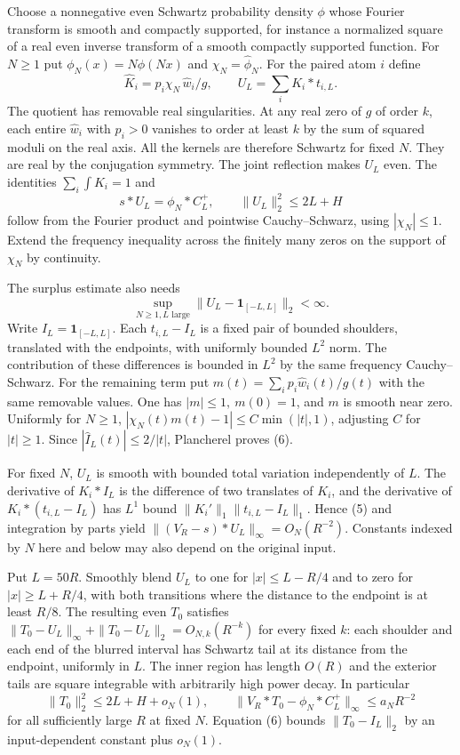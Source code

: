 \documentclass[11pt]{article}
\begin{document}
Choose a nonnegative even Schwartz probability density \(\phi\) whose Fourier transform is smooth and compactly supported, for instance a normalized square of a real even inverse transform of a smooth compactly supported function. For \(N\ge1\) put \(\phi_N(x)=N\phi(Nx)\) and \(\chi_N=\widehat\phi_N\). For the paired atom \(i\) define
\[
 \widehat K_i=p_i\chi_N\,\widehat w_i/g,\qquad U_L=\sum_i K_i*t_{i,L}.
\]
The quotient has removable real singularities. At any real zero of \(g\) of order \(k\), each entire \(\widehat w_i\) with \(p_i>0\) vanishes to order at least \(k\) by the sum of squared moduli on the real axis. All the kernels are therefore Schwartz for fixed \(N\). They are real by the conjugation symmetry. The joint reflection makes \(U_L\) even. The identities \(\sum_i\int K_i=1\) and
\[
       s*U_L=\phi_N*C_L^+,\qquad \|U_L\|_2^2\le2L+H
\]
follow from the Fourier product and pointwise Cauchy--Schwarz, using \(|\chi_N|\le1\). Extend the frequency inequality across the finitely many zeros on the support of \(\chi_N\) by continuity.

The surplus estimate also needs
\[
          \sup_{N\ge1,L\text{ large}}\|U_L-\mathbf1_{[-L,L]}\|_2<\infty. \tag{6}
\]
Write \(I_L=\mathbf1_{[-L,L]}\). Each \(t_{i,L}-I_L\) is a fixed pair of bounded shoulders, translated with the endpoints, with uniformly bounded \(L^2\) norm. The contribution of these differences is bounded in \(L^2\) by the same frequency Cauchy--Schwarz. For the remaining term put \(m(t)=\sum_i p_i\widehat w_i(t)/g(t)\) with the same removable values. One has \(|m|\le1,\ m(0)=1\), and \(m\) is smooth near zero. Uniformly for \(N\ge1\), \(|\chi_N(t)m(t)-1|\le C\min(|t|,1)\), adjusting \(C\) for \(|t|\ge1\). Since \(|\widehat I_L(t)|\le 2/|t|\), Plancherel proves (6).

For fixed \(N\), \(U_L\) is smooth with bounded total variation independently of \(L\). The derivative of \(K_i*I_L\) is the difference of two translates of \(K_i\), and the derivative of \(K_i*(t_{i,L}-I_L)\) has \(L^1\) bound \(\|K_i'\|_1\|t_{i,L}-I_L\|_1\). Hence (5) and integration by parts yield \(\|(V_R-s)*U_L\|_\infty=O_N(R^{-2})\). Constants indexed by \(N\) here and below may also depend on the original input.

Put \(L=50R\). Smoothly blend \(U_L\) to one for \(|x|\le L-R/4\) and to zero for \(|x|\ge L+R/4\), with both transitions where the distance to the endpoint is at least \(R/8\). The resulting even \(T_0\) satisfies \(\|T_0-U_L\|_\infty+\|T_0-U_L\|_2=O_{N,k}(R^{-k})\) for every fixed \(k\): each shoulder and each end of the blurred interval has Schwartz tail at its distance from the endpoint, uniformly in \(L\). The inner region has length \(O(R)\) and the exterior tails are square integrable with arbitrarily high power decay. In particular
\[
 \|T_0\|_2^2\le2L+H+o_N(1),\qquad
 \|V_R*T_0-\phi_N*C_L^+\|_\infty\le a_N R^{-2}                  \tag{7}
\]
for all sufficiently large \(R\) at fixed \(N\). Equation (6) bounds \(\|T_0-I_L\|_2\) by an input-dependent constant plus \(o_N(1)\).
\end{document}
